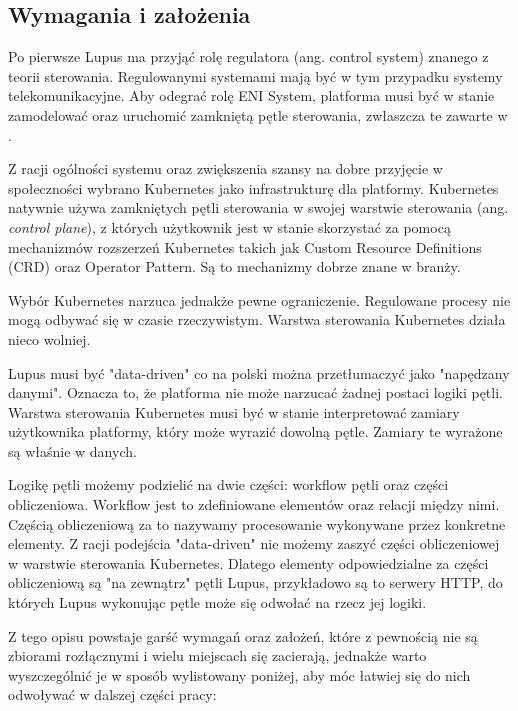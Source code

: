 \subsection{Wymagania i założenia}

Po pierwsze Lupus ma przyjąć rolę regulatora (ang. {control system}) znanego z teorii sterowania. Regulowanymi systemami mają być w tym przypadku systemy telekomunikacyjne. Aby odegrać rolę ENI System, platforma musi być w stanie zamodelować oraz uruchomić  zamkniętą pętle sterowania, zwłaszcza te zawarte w \cite{enioverview}. 

Z racji ogólności systemu oraz zwiększenia szansy na dobre przyjęcie w społeczności wybrano Kubernetes jako infrastrukturę dla platformy. Kubernetes natywnie używa zamkniętych pętli sterowania w swojej warstwie sterowania (ang. \textit{control plane}), z których użytkownik jest w stanie skorzystać za pomocą mechanizmów rozszerzeń Kubernetes takich jak Custom Resource Definitions (CRD) oraz Operator Pattern. Są to mechanizmy dobrze znane w branży. 

Wybór Kubernetes narzuca jednakże pewne ograniczenie. Regulowane procesy nie mogą odbywać się w czasie rzeczywistym. Warstwa sterowania Kubernetes działa nieco wolniej. 

Lupus musi być "data-driven" co na polski można przetłumaczyć jako "napędzany danymi". Oznacza to, że platforma nie może narzucać żadnej postaci logiki pętli. Warstwa sterowania Kubernetes musi być w stanie interpretować zamiary użytkownika platformy, który może wyrazić dowolną pętle. Zamiary te wyrażone są właśnie w danych. 

Logikę pętli możemy podzielić na dwie części: workflow pętli oraz części obliczeniowa. Workflow jest to zdefiniowane elementów oraz relacji między nimi. Częścią obliczeniową za to nazywamy procesowanie wykonywane przez konkretne elementy. Z racji podejścia "data-driven" nie możemy zaszyć części obliczeniowej w warstwie sterowania Kubernetes. Dlatego elementy odpowiedzialne za części obliczeniową są "na zewnątrz" pętli Lupus, przykładowo są to serwery HTTP, do których Lupus wykonując pętle może się odwołać na rzecz jej logiki.

Z tego opisu powstaje garść wymagań oraz założeń, które z pewnością nie są zbiorami rozłącznymi i wielu miejscach się zacierają, jednakże warto wyszczególnić je w sposób wylistowany poniżej, aby móc łatwiej się do nich odwoływać w dalszej części pracy:

